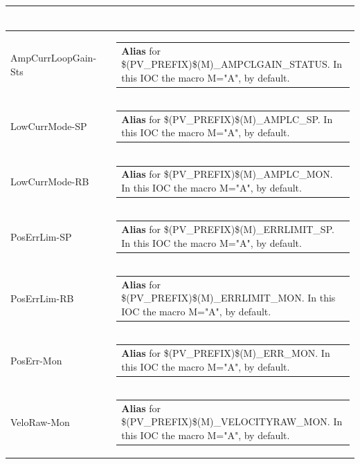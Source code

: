 \documentclass[openany]{article}
\begin{document}
\begin{longtable}{| m{4.5cm} m{2.5cm}  m{8.5cm} |}
\begin{tabular}{@{}m{6cm}@{}}
            \end{tabular} \hypertarget{}{}\\ \hline
        AmpCurrLoopGain-Sts &  & \begin{tabular}{@{}m{6cm}@{}}
                \textbf{\color{blue} Alias} for \$(PV\_PREFIX)\$(M)\_AMPCLGAIN\_STATUS. In this IOC the macro M="A", by default.
            \end{tabular} \hypertarget{pv:low-curr-mode}{}\\ \hline
        LowCurrMode-SP &  & \begin{tabular}{@{}m{6cm}@{}}
                \textbf{\color{blue} Alias} for \$(PV\_PREFIX)\$(M)\_AMPLC\_SP. In this IOC the macro M="A", by default.
            \end{tabular} \hypertarget{}{}\\ \hline
        LowCurrMode-RB &  & \begin{tabular}{@{}m{6cm}@{}}
                \textbf{\color{blue} Alias} for \$(PV\_PREFIX)\$(M)\_AMPLC\_MON. In this IOC the macro M="A", by default.
            \end{tabular} \hypertarget{pv:pos-err-lim}{}\\ \hline
        PosErrLim-SP &  & \begin{tabular}{@{}m{6cm}@{}}
                \textbf{\color{blue} Alias} for \$(PV\_PREFIX)\$(M)\_ERRLIMIT\_SP. In this IOC the macro M="A", by default.
            \end{tabular} \hypertarget{}{}\\ \hline
        PosErrLim-RB &  & \begin{tabular}{@{}m{6cm}@{}}
                \textbf{\color{blue} Alias} for \$(PV\_PREFIX)\$(M)\_ERRLIMIT\_MON. In this IOC the macro M="A", by default.
            \end{tabular} \hypertarget{pv:pos-err-mon}{}\\ \hline
        PosErr-Mon &  & \begin{tabular}{@{}m{6cm}@{}}
                \textbf{\color{blue} Alias} for \$(PV\_PREFIX)\$(M)\_ERR\_MON. In this IOC the macro M="A", by default.
            \end{tabular} \hypertarget{pv:velo-raw-mon}{}\\ \hline
        VeloRaw-Mon &  & \begin{tabular}{@{}m{6cm}@{}}
                \textbf{\color{blue} Alias} for \$(PV\_PREFIX)\$(M)\_VELOCITYRAW\_MON. In this IOC the macro M="A", by default.

\end{tabular}
\end{longtable}
\end{document}
